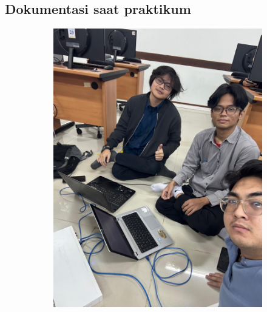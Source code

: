 \subsection{Dokumentasi saat praktikum}
\begin{figure}[H]
	\centering
	\begin{subfigure}[b]{0.4\linewidth}
		\centering
		\includegraphics[width=\linewidth]{P2/img/dokum (1).jpg}
	\end{subfigure}
	\begin{subfigure}[b]{0.4\linewidth}
		\centering

\end{subfigure}
\end{figure}
